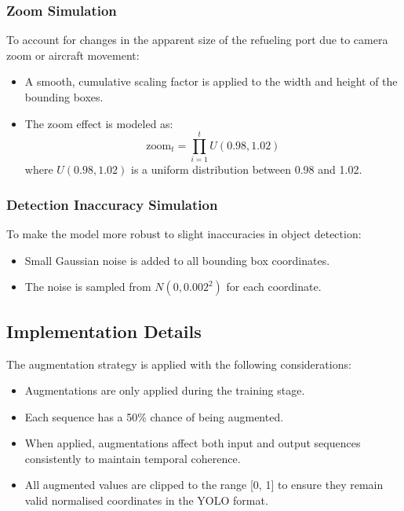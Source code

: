 \documentclass[12pt,oneside]{book} %
\begin{document}
\subsubsection*{Zoom Simulation}

To account for changes in the apparent size of the refueling port due to camera
zoom or aircraft movement:

\begin{itemize}
    \item A smooth, cumulative scaling factor is applied to the width and height of the
          bounding boxes.
    \item The zoom effect is modeled as:
          \begin{equation}
              \text{zoom}_t = \prod_{i=1}^t U(0.98, 1.02)
          \end{equation}
          where $U(0.98, 1.02)$ is a uniform distribution between 0.98 and 1.02.
\end{itemize}

\subsubsection*{Detection Inaccuracy Simulation}

To make the model more robust to slight inaccuracies in object detection:

\begin{itemize}
    \item Small Gaussian noise is added to all bounding box coordinates.
    \item The noise is sampled from $N(0, 0.002^2)$ for each coordinate.
\end{itemize}

\subsection{Implementation Details}

The augmentation strategy is applied with the following considerations:

\begin{itemize}
    \item Augmentations are only applied during the training stage.
    \item Each sequence has a 50\% chance of being augmented.
    \item When applied, augmentations affect both input and output sequences consistently
          to maintain temporal coherence.
    \item All augmented values are clipped to the range [0, 1] to ensure they remain
          valid normalised coordinates in the YOLO format.
\end{itemize}
\end{document}
